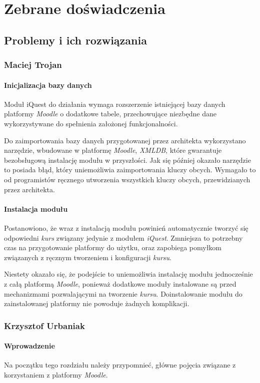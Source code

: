 \chapter{Zebrane doświadczenia}
\label{Chapter8}

\section{Problemy i ich rozwiązania}
\subsection{Maciej Trojan}
\subsubsection{Inicjalizacja bazy danych}
Moduł iQuest do działania wymaga rozszerzenie istniejącej bazy danych platformy \emph{Moodle} o dodatkowe tabele, przechowujące niezbędne dane wykorzystywane do spełnienia założonej funkcjonalności.

Do zaimportowania bazy danych przygotowanej przez architekta wykorzystano narzędzie, wbudowane w platformę \emph{Moodle}, \emph{XMLDB}, które gwarantuje bezobsługową instalację modułu w przyszłości. Jak się później okazało narzędzie to posiada błąd, który uniemożliwia zaimportowania kluczy obcych. Wymagało to od programistów ręcznego utworzenia wszystkich kluczy obcych, przewidzianych przez architekta.

\subsubsection{Instalacja modułu}
Postanowiono, że wraz z instalacją modułu powinień automatycznie tworzyć się odpowiedni \emph{kurs} związany jedynie z modułem \emph{iQuest}. Zmniejsza to potrzebny czas na przygotowanie platformy do użytku, oraz zapobiega pomyłkom związanych z ręcznym tworzeniem i konfiguracji \emph{kursu}. 

Niestety okazało się, że podejście to uniemożliwia instalację modułu jednocześnie z całą platformą \emph{Moodle}, ponieważ dodatkowe moduły instalowane są przed mechanizmami pozwalającymi na tworzenie \emph{kursu}. Doinstalowanie modułu do zainstalowanej platformy nie powoduje żadnych komplikacji.

\subsection{Krzysztof Urbaniak}
\subsubsection{Wprowadzenie}
Na początku tego rozdziału należy przypomnieć, główne pojęcia związane z korzystaniem z platformy \emph{Moodle}.


